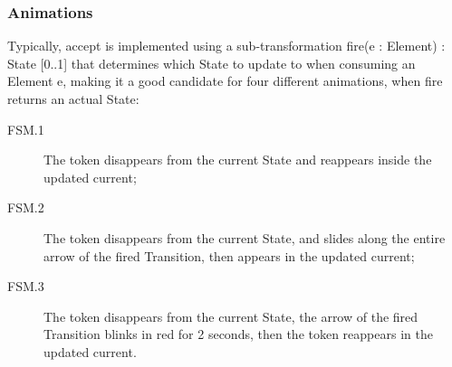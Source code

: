 
\subsubsection{Animations}
\label{sec:Examples:FSM:Animations}




Typically, \textsf{accept} is implemented using a sub-transformation 
\textsf{fire(e : Element) : State [0..1]} that determines which \textsf{State} 
to update to when consuming an \textsf{Element} \textsf{e}, making it a good 
candidate for four different animations, when \textsf{fire} returns an actual 
\textsf{State}:
\begin{description}
   \item[FSM.1] The token disappears from the \textsf{current} \textsf{State} and
   reappears inside the updated \textsf{current};
   \item[FSM.2] The token disappears from the \textsf{current} \textsf{State}, and
   slides along the entire arrow of the fired \textsf{Transition}, then appears in
   the updated \textsf{current};
   \item[FSM.3] The token disappears from the \textsf{current} \textsf{State}, the
   arrow of the fired \textsf{Transition} blinks in red for 2 seconds, then the 
   token reappears in the updated \textsf{current}.
\end{description}


